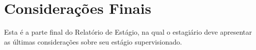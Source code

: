 \chapter{Considerações Finais}
\label{cap:consideracoes}

Esta é a parte final do Relatório de Estágio, na qual o estagiário deve apresentar as últimas considerações sobre seu estágio supervisionado. 